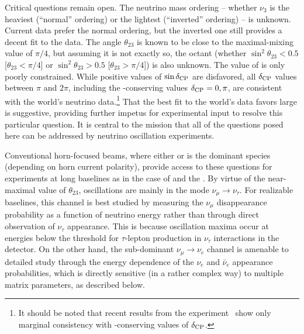 Critical questions remain open. The neutrino mass ordering -- whether $\nu_3$ is 
the heaviest (``normal'' ordering) or the lightest (``inverted'' ordering) -- is unknown. 
Current data prefer the normal ordering, but the inverted one still 
provides a decent fit to the data. The angle $\theta_{23}$ is known to be 
close to the maximal-mixing value of $\pi/4$, but assuming it is not exactly 
so, the octant 
(whether $\sin^2\theta_{23}<0.5$ [$\theta_{23}<\pi/4$] or 
$\sin^2\theta_{23}>0.5$ [$\theta_{23}>\pi/4$]) is also unknown. 
The value of \deltacp is only poorly constrained. 
While positive values of $\sin\delta_{\rm CP}$ are disfavored, all $\delta_{\rm CP}$ values between $\pi$ and $2\pi$, including the -conserving values $\delta_{\rm CP}=0,\pi$, are consistent with the world's neutrino data.\footnote{It should be noted that recent results from the  experiment~\cite{Abe:2019vii} show only marginal consistency with -conserving values of $\delta_{\rm CP}$.}
That the best fit to the world's data 
favors large  is suggestive, providing further impetus 
for experimental input to resolve this particular question.
It is central to the  mission that all of the questions 
posed here can be addressed 
by neutrino oscillation experiments.

Conventional horn-focused beams, where either \numu or \anumu 
is the dominant species (depending on horn current polarity), provide 
access to these questions for experiments at long baselines as in the case 
of  and the .  By virtue 
of the near-maximal value of $\theta_{23}$, oscillations are mainly in the  
mode $\nu_\mu \rightarrow \nu_\tau$.  For realizable baselines, 
this channel is best studied by 
measuring the $\nu_\mu$ disappearance probability as a function of 
neutrino energy rather than through direct observation of $\nu_\tau$ 
appearance.  This is because oscillation maxima occur at energies 
below the threshold for $\tau$-lepton production in $\nu_\tau$ 
 interactions in the detector.
On the other hand, the sub-dominant $\nu_\mu \rightarrow \nu_e$ channel is 
amenable to detailed study through the energy dependence of the
$\nu_e$ and $\bar\nu_e$ appearance probabilities, 
which is directly sensitive (in a rather complex way) to 
multiple  matrix parameters, as described below.  

